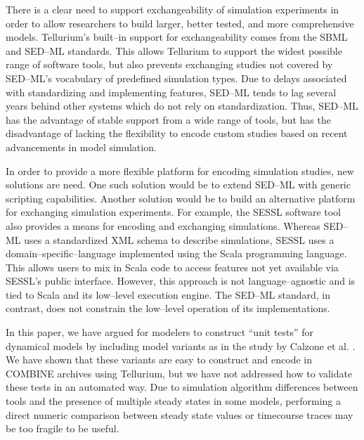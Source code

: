 \documentclass[10pt,letterpaper]{article}
\begin{document}
There is a clear need to support exchangeability of simulation experiments in order to allow researchers to build larger, better tested, and more comprehensive models. Tellurium's built--in support for exchangeability comes from the SBML and SED--ML standards. This allows Tellurium to support the widest possible range of software tools, but also prevents exchanging studies not covered by SED--ML's vocabulary of predefined simulation types. Due to delays associated with standardizing and implementing features, SED--ML tends to lag several years behind other systems which do not rely on standardization. Thus, SED--ML has the advantage of stable support from a wide range of tools, but has the disadvantage of lacking the flexibility to encode custom studies based on recent advancements in model simulation.

In order to provide a more flexible platform for encoding simulation studies, new solutions are need. One such solution would be to extend SED--ML with generic scripting capabilities. Another solution would be to build an alternative platform for exchanging simulation experiments. For example, the SESSL \cite{ewald2014sessl} software tool also provides a means for encoding and exchanging simulations. Whereas SED--ML uses a standardized XML schema to describe simulations, SESSL uses a domain--specific--language implemented using the Scala programming language. This allows users to mix in Scala code to access features not yet available via SESSL's public interface. However, this approach is not language--agnostic and is tied to Scala and its low--level execution engine. The SED--ML standard, in contrast, does not constrain the low--level operation of its implementations.

In this paper, we have argued for modelers to construct ``unit tests'' for dynamical models by including model variants as in the study by Calzone et al. \cite{calzone2007dynamical}. We have shown that these variants are easy to construct and encode in COMBINE archives using Tellurium, but we have not addressed how to validate these tests in an automated way. Due to simulation algorithm differences between tools and the presence of multiple steady states in some models, performing a direct numeric comparison between steady state values or timecourse traces may be too fragile to be useful.
\end{document}
